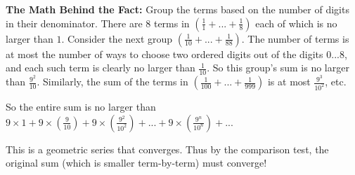 \documentclass[10pt]{report}
\begin{document}
\textbf{The Math Behind the Fact:}
Group the terms based on the number of digits in their denominator. There are $8$ terms in $(\frac{1}{1}+...+ \frac{1}{8})$ each of which is no larger than $1$. Consider the next group $(\frac{1}{10}+...+\frac{1}{88})$. The number of terms is at most the number of ways to choose two ordered digits out of the digits $0...8$, and each such term is clearly no larger than $\frac{1}{10}$. So this group's sum is no larger than $\frac{9^2}{10}$. Similarly, the sum of the terms in $(\frac{1}{100}+...+\frac{1}{999})$ is at most $\frac{9^3}{10^2}$, etc.

So the entire sum is no larger than
$9\times 1 + 9\times(\frac{9}{10}) + 9\times(\frac{9^2}{10^2}) + ... + 9\times(\frac{9^n}{10^n}) + ...$

This is a geometric series that converges. Thus by the comparison test, the original sum (which is smaller term-by-term) must converge!
\end{document}
